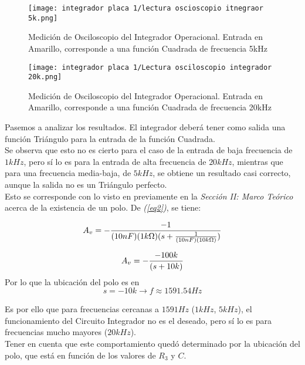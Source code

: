 \documentclass[letterpaper, 10 pt, conference]{ieeeconf}  %
\begin{document}
\begin{figure}[H]
  \centering
  \texttt{[image: integrador placa 1/lectura oscioscopio itnegraor 5k.png]}
  \caption{Medición de Osciloscopio del Integrador Operacional. Entrada en Amarillo, corresponde a una función Cuadrada de frecuencia 5kHz}
  \label{fig:inte5k}
\end{figure}

\begin{figure}[H]
  \centering
  \texttt{[image: integrador placa 1/Lectura osciloscopio integrador 20k.png]}
  \caption{Medición de Osciloscopio del Integrador Operacional. Entrada en Amarillo, corresponde a una función Cuadrada de frecuencia 20kHz}
  \label{fig:inte20k}
\end{figure}

Pasemos a analizar los resultados.
El integrador deberá tener como salida una función Triángulo para la entrada de la función Cuadrada.\\
Se observa que esto no es cierto para el caso de la entrada de baja frecuencia de $1kHz$, pero sí lo es para la entrada de alta frecuencia de $20kHz$, mientras que para una frecuencia media-baja, de $5kHz$, se obtiene un resultado casi correcto, aunque la salida no es un Triángulo perfecto.\\
Esto se corresponde con lo visto en previamente en la \textit{Sección II: Marco Teórico} acerca de la existencia de un polo. De \textit{(\ref{eq2})}, se tiene:


            \begin{equation}
            A_v =- \frac{-1}{(10nF)(1k\Omega)(s+\frac{1}{(10nF)(10k\Omega)})} \\
            \end{equation}

            \begin{equation}
            A_v =- \frac{-100k}{(s+10k)} \\
            \end{equation}
Por lo que la ubicación del polo es en  $$ s=-10k \rightarrow \textit{f} \approx 1591.54Hz $$

Es por ello que para frecuencias cercanas a $1591Hz$ ($1kHz$, $5kHz$), el funcionamiento del Circuito Integrador no es el deseado, pero sí lo es para frecuencias mucho mayores ($20kHz$).\\
Tener en cuenta que este comportamiento quedó determinado por la ubicación del polo, que está en función de los valores de $R_3$ y $C$.\\
\end{document}
